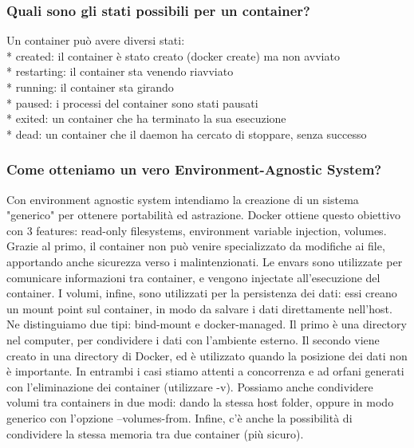 \documentclass[11pt]{article}
\begin{document}
\subsubsection{Quali sono gli stati possibili per un container?}
Un container può avere diversi stati:
\\* created: il container è stato creato (docker create) ma non avviato
\\* restarting: il container sta venendo riavviato
\\* running: il container sta girando 
\\* paused: i processi del container sono stati pausati
\\* exited: un container che ha terminato la sua esecuzione 
\\* dead: un container che il daemon ha cercato di stoppare, senza successo

\subsubsection{Come otteniamo un vero Environment-Agnostic System?}
Con environment agnostic system intendiamo la creazione di un sistema "generico" per ottenere portabilità ed astrazione. Docker ottiene questo obiettivo con 3 features: read-only filesystems, environment variable injection, volumes. Grazie al primo, il container non può venire specializzato da modifiche ai file, apportando anche sicurezza verso i malintenzionati. Le envars sono utilizzate per comunicare informazioni tra container, e vengono injectate all'esecuzione del container. I volumi, infine, sono utilizzati per la persistenza dei dati: essi creano un mount point sul container, in modo da salvare i dati direttamente nell'host. Ne distinguiamo due tipi: bind-mount e docker-managed. Il primo è una directory nel computer, per condividere i dati con l'ambiente esterno. Il secondo viene creato in una directory di Docker, ed è utilizzato quando la posizione dei dati non è importante. In entrambi i casi stiamo attenti a concorrenza e ad orfani generati con l'eliminazione dei container (utilizzare -v). Possiamo anche condividere volumi tra containers in due modi: dando la stessa host folder, oppure in modo generico con l'opzione --volumes-from. Infine, c'è anche la possibilità di condividere la stessa memoria tra due container (più sicuro). 
\end{document}

